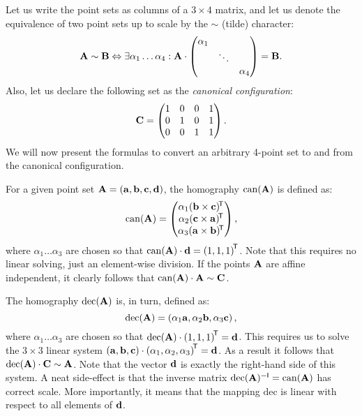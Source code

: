 Let us write the point sets as columns of a $3 \times 4$ matrix, and let us denote the equivalence of two point sets up to scale by the $\sim$ (tilde) character:
$$\mathbf{A} \sim \mathbf{B} \Leftrightarrow \exists \alpha_1 \dots \alpha_4 : \mathbf{A} \cdot \begin{pmatrix}
 \alpha_1 & & \\
  & \ddots & \\
 & & \alpha_4
 \end{pmatrix} = \mathbf{B}.$$
Also, let us declare the following set as the \textit{canonical configuration}:
$$\mathbf{C} = \begin{pmatrix}
 1 & 0 & 0 & 1 \\
 0 & 1 & 0 & 1 \\
 0 & 0 & 1 & 1
 \end{pmatrix}.$$
We will now present the formulas to convert an arbitrary 4-point set to and from the canonical configuration.

For a given point set $\mathbf{A} = \left( \mathbf{a}, \mathbf{b}, \mathbf{c}, \mathbf{d} \right)$, the homography $\mathrm{can}(\mathbf{A})$ is defined as:
$$\mathrm{can}(\mathbf{A}) = \begin{pmatrix}
 \alpha_1 (\mathbf{b} \times \mathbf{c}) ^{\!\mathsf{T}} \\
 \alpha_2 (\mathbf{c} \times \mathbf{a}) ^{\!\mathsf{T}} \\
 \alpha_3 (\mathbf{a} \times \mathbf{b}) ^{\!\mathsf{T}} \\
 \end{pmatrix},
$$
where $\alpha_1 \dots \alpha_3$ are chosen so that $\mathrm{can}(\mathbf{A}) \cdot \mathbf{d} = \left( 1, 1, 1 \right)^{\!\mathsf{T}}$.
Note that this requires no linear solving, just an element-wise division.
If the points $\mathbf{A}$ are affine independent, it clearly follows that $\mathrm{can}(\mathbf{A}) \cdot \mathbf{A} \sim \mathbf{C}$.

The homography $\mathrm{dec}(\mathbf{A})$ is, in turn, defined as:
$$\mathrm{dec}(\mathbf{A}) = \left( \alpha_1 \mathbf{a}, \alpha_2 \mathbf{b}, \alpha_3 \mathbf{c} \right),$$
where $\alpha_1 \dots \alpha_3$ are chosen so that $\mathrm{dec}(\mathbf{A}) \cdot \left( 1, 1, 1 \right)^{\!\mathsf{T}} = \mathbf{d}$.
This requires us to solve the $3 \times 3$ linear system $\left(\mathbf{a}, \mathbf{b}, \mathbf{c} \right) \cdot \left(\alpha_1, \alpha_2, \alpha_3 \right) ^{\!\mathsf{T}} = \mathbf{d}$.
As a result it follows that $\mathrm{dec}(\mathbf{A}) \cdot \mathbf{C} \sim \mathbf{A}$.
Note that the vector $\mathbf{d}$ is exactly the right-hand side of this system.
A neat side-effect is that the inverse matrix $\mathrm{dec}(\mathbf{A}) ^{-\mathsf{I}} = \mathrm{can}(\mathbf{A})$ has correct scale. 
More importantly, it means that the mapping $\mathrm{dec}$ is linear with respect to all elements of $\mathbf{d}$.


